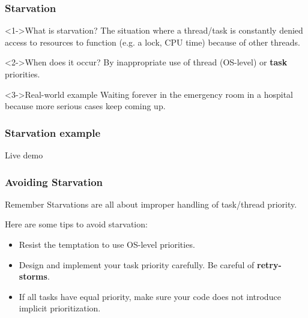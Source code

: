 \documentclass[xcolor={dvipsnames,svgnames},aspectratio=169]{beamer}
\begin{document}
\begin{frame}[fragile]
  \frametitle{Starvation}

  \begin{block}<1->{\faSearch \quad What is starvation?}
    The situation where a thread/task is constantly denied access to resources to
    function (e.g. a lock, CPU time) because of other threads.
  \end{block}
  \vspace{0.5cm}
  \begin{block}<2->{\faSearch \quad When does it occur?}
    By inappropriate use of thread (OS-level) or \textbf{task} priorities.
  \end{block}
  \vspace{0.5cm}
  \begin{block}<3->{\faSearch \quad Real-world example}
    Waiting forever in the emergency room in a hospital because more serious
    cases keep coming up. 
  \end{block}
\end{frame}

\begin{frame}[fragile]
  \frametitle{Starvation example}

  \centering \huge
  Live demo

\end{frame}

\begin{frame}[fragile]
  \frametitle{Avoiding Starvation}

  \begin{block}{\faExclamationTriangle \quad Remember}
    Starvations are all about improper handling of task/thread priority.
  \end{block}

  Here are some tips to avoid starvation:

  \begin{itemize}
  \item[\faBook]<2-> Resist the temptation to use OS-level priorities.
  \item[\faBook]<3-> Design and implement your task priority carefully. Be
    careful of \textbf{retry-storms}.
  \item[\faBook]<4-> If all tasks have equal priority, make sure your code does
    not introduce implicit prioritization.
  \end{itemize}

\end{frame}
\end{document}
